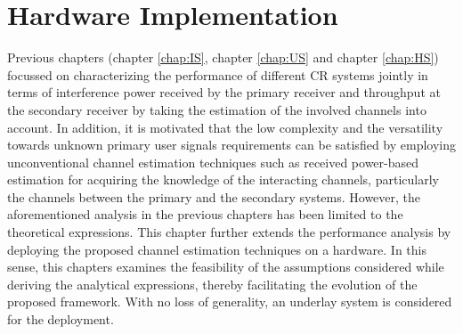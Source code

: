 \chapter{Hardware Implementation}
\label{chap:Field}

Previous chapters (chapter \ref{chap:IS}, chapter \ref{chap:US} and chapter \ref{chap:HS}) focussed on characterizing the performance of different CR systems jointly in terms of interference power received by the primary receiver and throughput at the secondary receiver by taking the estimation of the involved channels into account. In addition, it is motivated that the low complexity and the versatility towards unknown primary user signals requirements can be satisfied by employing unconventional channel estimation techniques such as received power-based estimation for acquiring the knowledge of the interacting channels, particularly the channels between the primary and the secondary systems. However, the aforementioned analysis in the previous chapters has been limited to the theoretical expressions. This chapter further extends the performance analysis by deploying the proposed channel estimation techniques on a hardware. In this sense, this chapters examines the feasibility of the assumptions considered while deriving the analytical expressions, thereby facilitating the evolution of the proposed framework. With no loss of generality, an underlay system is considered for the deployment.    

